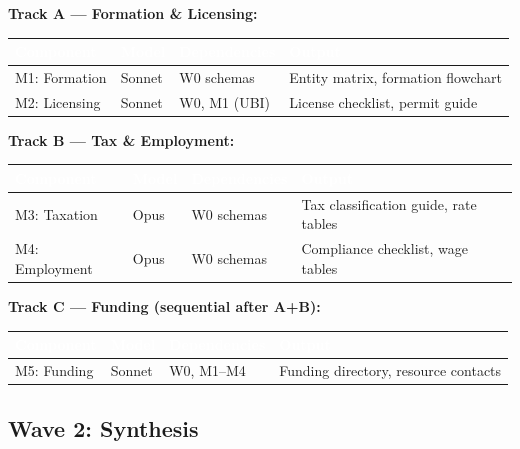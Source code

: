 \documentclass[11pt,letterpaper]{article}
\newcommand{\tableheader}[1]{\textbf{\sffamily\textcolor{white}{#1}}}
\begin{document}
\textbf{Track A --- Formation \& Licensing:}

\begin{center}
\begin{tabularx}{\textwidth}{L{3cm}C{1.5cm}L{2.5cm}X}
\toprule
{}
\tableheader{Component} & \tableheader{Model} & \tableheader{Dependencies} & \tableheader{Output} \\
\midrule
M1: Formation & Sonnet & W0 schemas & Entity matrix, formation flowchart \\
M2: Licensing & Sonnet & W0, M1 (UBI) & License checklist, permit guide \\
\bottomrule
\end{tabularx}
\end{center}

\textbf{Track B --- Tax \& Employment:}

\begin{center}
\begin{tabularx}{\textwidth}{L{3cm}C{1.5cm}L{2.5cm}X}
\toprule
{}
\tableheader{Component} & \tableheader{Model} & \tableheader{Dependencies} & \tableheader{Output} \\
\midrule
M3: Taxation & Opus & W0 schemas & Tax classification guide, rate tables \\
M4: Employment & Opus & W0 schemas & Compliance checklist, wage tables \\
\bottomrule
\end{tabularx}
\end{center}

\textbf{Track C --- Funding (sequential after A+B):}

\begin{center}
\begin{tabularx}{\textwidth}{L{3cm}C{1.5cm}L{2.5cm}X}
\toprule
{}
\tableheader{Component} & \tableheader{Model} & \tableheader{Dependencies} & \tableheader{Output} \\
\midrule
M5: Funding & Sonnet & W0, M1--M4 & Funding directory, resource contacts \\
\bottomrule
\end{tabularx}
\end{center}

\subsection{Wave 2: Synthesis}
\end{document}
